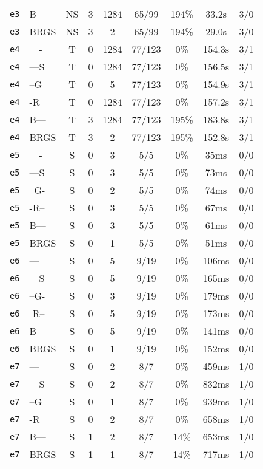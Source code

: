 \begin{tabular}{llccccccc}
\texttt{e3} & B--- & NS & 3 & 1284 & 65/99 & 194\% & 33.2s & 3/0 \\
\texttt{e3} & BRGS & NS & 3 & 2 & 65/99 & 194\% & 29.0s & 3/0 \\
\texttt{e4} & ---- & T & 0 & 1284 & 77/123 & 0\% & 154.3s & 3/1 \\
\texttt{e4} & ---S & T & 0 & 1284 & 77/123 & 0\% & 156.5s & 3/1 \\
\texttt{e4} & --G- & T & 0 & 5 & 77/123 & 0\% & 154.9s & 3/1 \\
\texttt{e4} & -R-- & T & 0 & 1284 & 77/123 & 0\% & 157.2s & 3/1 \\
\texttt{e4} & B--- & T & 3 & 1284 & 77/123 & 195\% & 183.8s & 3/1 \\
\texttt{e4} & BRGS & T & 3 & 2 & 77/123 & 195\% & 152.8s & 3/1 \\
\texttt{e5} & ---- & S & 0 & 3 & 5/5 & 0\% & 35ms & 0/0 \\
\texttt{e5} & ---S & S & 0 & 3 & 5/5 & 0\% & 73ms & 0/0 \\
\texttt{e5} & --G- & S & 0 & 2 & 5/5 & 0\% & 74ms & 0/0 \\
\texttt{e5} & -R-- & S & 0 & 3 & 5/5 & 0\% & 67ms & 0/0 \\
\texttt{e5} & B--- & S & 0 & 3 & 5/5 & 0\% & 61ms & 0/0 \\
\texttt{e5} & BRGS & S & 0 & 1 & 5/5 & 0\% & 51ms & 0/0 \\
\texttt{e6} & ---- & S & 0 & 5 & 9/19 & 0\% & 106ms & 0/0 \\
\texttt{e6} & ---S & S & 0 & 5 & 9/19 & 0\% & 165ms & 0/0 \\
\texttt{e6} & --G- & S & 0 & 3 & 9/19 & 0\% & 179ms & 0/0 \\
\texttt{e6} & -R-- & S & 0 & 5 & 9/19 & 0\% & 173ms & 0/0 \\
\texttt{e6} & B--- & S & 0 & 5 & 9/19 & 0\% & 141ms & 0/0 \\
\texttt{e6} & BRGS & S & 0 & 1 & 9/19 & 0\% & 152ms & 0/0 \\
\texttt{e7} & ---- & S & 0 & 2 & 8/7 & 0\% & 459ms & 1/0 \\
\texttt{e7} & ---S & S & 0 & 2 & 8/7 & 0\% & 832ms & 1/0 \\
\texttt{e7} & --G- & S & 0 & 1 & 8/7 & 0\% & 939ms & 1/0 \\
\texttt{e7} & -R-- & S & 0 & 2 & 8/7 & 0\% & 658ms & 1/0 \\
\texttt{e7} & B--- & S & 1 & 2 & 8/7 & 14\% & 653ms & 1/0 \\
\texttt{e7} & BRGS & S & 1 & 1 & 8/7 & 14\% & 717ms & 1/0 \\

\end{tabular}
